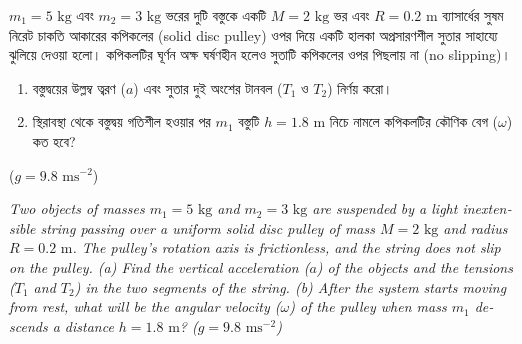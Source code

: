 \documentclass[12pt, a4paper]{article}
\begin{document}
\begin{tcolorbox}[questionbox={প্রশ্ন (Question) 1}]
\noindent
$m_1 = 5\text{ kg}$ এবং $m_2 = 3\text{ kg}$ ভরের দুটি বস্তুকে একটি $M = 2\text{ kg}$ ভর এবং $R = 0.2\text{ m}$ ব্যাসার্ধের সুষম নিরেট চাকতি আকারের কপিকলের (solid disc pulley) ওপর দিয়ে একটি হালকা অপ্রসারণশীল সুতার সাহায্যে ঝুলিয়ে দেওয়া হলো। কপিকলটির ঘূর্ণন অক্ষ ঘর্ষণহীন হলেও সুতাটি কপিকলের ওপর পিছলায় না (no slipping)। 
\begin{enumerate}
    \item[(ক)] বস্তুদ্বয়ের উল্লম্ব ত্বরণ ($a$) এবং সুতার দুই অংশের টানবল ($T_1$ ও $T_2$) নির্ণয় করো।
    \item[(খ)] স্থিরাবস্থা থেকে বস্তুদ্বয় গতিশীল হওয়ার পর $m_1$ বস্তুটি $h = 1.8\text{ m}$ নিচে নামলে কপিকলটির কৌণিক বেগ ($\omega$) কত হবে?
\end{enumerate}
($g = 9.8\text{ ms}^{-2}$)

\vspace{0.8em}
\begin{english}
\noindent\textit{\color{darkgray}
Two objects of masses $m_1 = 5\text{ kg}$ and $m_2 = 3\text{ kg}$ are suspended by a light inextensible string passing over a uniform solid disc pulley of mass $M = 2\text{ kg}$ and radius $R = 0.2\text{ m}$. The pulley's rotation axis is frictionless, and the string does not slip on the pulley. 
(a) Find the vertical acceleration ($a$) of the objects and the tensions ($T_1$ and $T_2$) in the two segments of the string. 
(b) After the system starts moving from rest, what will be the angular velocity ($\omega$) of the pulley when mass $m_1$ descends a distance $h = 1.8\text{ m}$? ($g = 9.8\text{ ms}^{-2}$)
}
\end{english}
\end{tcolorbox}
\end{document}

